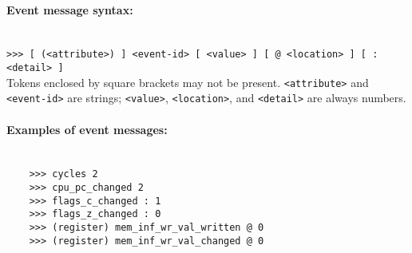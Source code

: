         \paragraph{Event message syntax:}~\\
            \verb'>>> [ (<attribute>) ] <event-id> [ <value> ] [ @ <location> ] [ : <detail> ]'\\

            Tokens enclosed by square brackets may not be present. \texttt{<attribute>} and \texttt{<event-id>} are strings; \texttt{<value>}, \texttt{<location>}, and \texttt{<detail>} are always numbers.

        \paragraph{Examples of event messages:}~\\
            \verb'    >>> cycles 2'\\
            \verb'    >>> cpu_pc_changed 2'\\
            \verb'    >>> flags_c_changed : 1'\\
            \verb'    >>> flags_z_changed : 0'\\
            \verb'    >>> (register) mem_inf_wr_val_written @ 0'\\
            \verb'    >>> (register) mem_inf_wr_val_changed @ 0'\\

